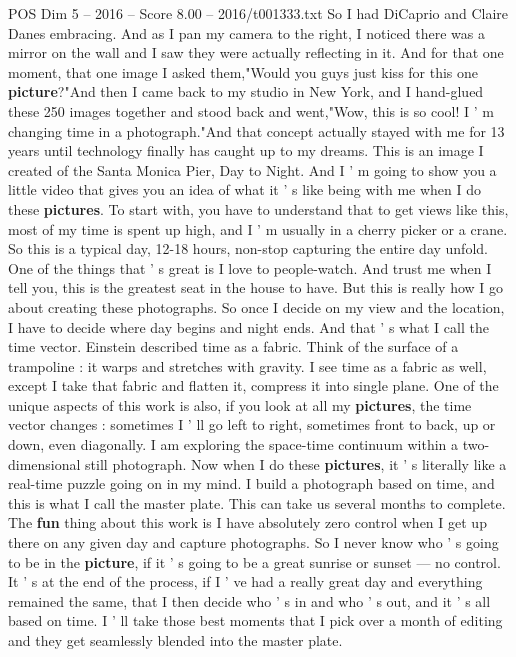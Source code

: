\begin{textsample}{POS Dim 5 – 2016 – Score 8.00 – 2016/t001333.txt}
So I had DiCaprio and Claire Danes embracing.
And as I pan my camera to the right, I noticed there was a mirror on the wall and I saw they were actually reflecting in it.
And for that one moment, that one image I asked them,"Would you guys just kiss for this one \textbf{picture}?"And then I came back to my studio in New York, and I hand-glued these 250 images together and stood back and went,"Wow, this is so cool!
I ' m changing time in a photograph."And that concept actually stayed with me for 13 years until technology finally has caught up to my dreams.
This is an image I created of the Santa Monica Pier, Day to Night.
And I ' m going to show you a little video that gives you an idea of what it ' s like being with me when I do these \textbf{pictures}.
To start with, you have to understand that to get views like this, most of my time is spent up high, and I ' m usually in a cherry picker or a crane.
So this is a typical day, 12-18 hours, non-stop capturing the entire day unfold.
One of the things that ' s great is I love to people-watch.
And trust me when I tell you, this is the greatest seat in the house to have.
But this is really how I go about creating these photographs.
So once I decide on my view and the location, I have to decide where day begins and night ends.
And that ' s what I call the time vector.
Einstein described time as a fabric.
Think of the surface of a trampoline : it warps and stretches with gravity.
I see time as a fabric as well, except I take that fabric and flatten it, compress it into single plane.
One of the unique aspects of this work is also, if you look at all my \textbf{pictures}, the time vector changes : sometimes I ' ll go left to right, sometimes front to back, up or down, even diagonally.
I am exploring the space-time continuum within a two-dimensional still photograph.
Now when I do these \textbf{pictures}, it ' s literally like a real-time puzzle going on in my mind.
I build a photograph based on time, and this is what I call the master plate.
This can take us several months to complete.
The \textbf{fun} thing about this work is I have absolutely zero control when I get up there on any given day and capture photographs.
So I never know who ' s going to be in the \textbf{picture}, if it ' s going to be a great sunrise or sunset — no control.
It ' s at the end of the process, if I ' ve had a really great day and everything remained the same, that I then decide who ' s in and who ' s out, and it ' s all based on time.
I ' ll take those best moments that I pick over a month of editing and they get seamlessly blended into the master plate.

\end{textsample}
